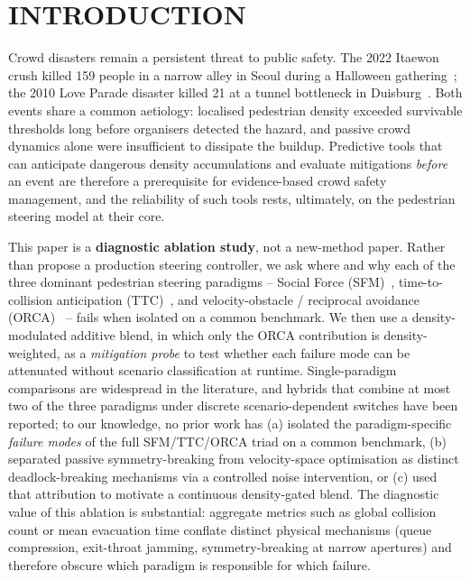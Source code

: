 \documentclass[a4paper,twoside]{article}
\begin{document}
\section{\uppercase{Introduction}}
\label{sec:introduction}

Crowd disasters remain a persistent threat to public safety. The 2022 Itaewon crush killed 159 people in a narrow alley in Seoul during a Halloween gathering~\cite{Lee24}; the 2010 Love Parade disaster killed 21 at a tunnel bottleneck in Duisburg~\cite{Helbing12}. Both events share a common aetiology: localised pedestrian density exceeded survivable thresholds long before organisers detected the hazard, and passive crowd dynamics alone were insufficient to dissipate the buildup. Predictive tools that can anticipate dangerous density accumulations and evaluate mitigations \emph{before} an event are therefore a prerequisite for evidence-based crowd safety management, and the reliability of such tools rests, ultimately, on the pedestrian steering model at their core.

This paper is a \textbf{diagnostic ablation study}, not a new-method paper. Rather than propose a production steering controller, we ask where and why each of the three dominant pedestrian steering paradigms -- Social Force (SFM)~\cite{Helbing95,Helbing00}, time-to-collision anticipation (TTC)~\cite{Karamouzas14}, and velocity-obstacle / reciprocal avoidance (ORCA)~\cite{Fiorini98,VandenBerg11} -- fails when isolated on a common benchmark. We then use a density-modulated additive blend, in which only the ORCA contribution is density-weighted, as a \emph{mitigation probe} to test whether each failure mode can be attenuated without scenario classification at runtime. Single-paradigm comparisons are widespread in the literature, and hybrids that combine at most two of the three paradigms under discrete scenario-dependent switches have been reported; to our knowledge, no prior work has (a) isolated the paradigm-specific \emph{failure modes} of the full SFM/TTC/ORCA triad on a common benchmark, (b) separated passive symmetry-breaking from velocity-space optimisation as distinct deadlock-breaking mechanisms via a controlled noise intervention, or (c) used that attribution to motivate a continuous density-gated blend. The diagnostic value of this ablation is substantial: aggregate metrics such as global collision count or mean evacuation time conflate distinct physical mechanisms (queue compression, exit-throat jamming, symmetry-breaking at narrow apertures) and therefore obscure which paradigm is responsible for which failure.
\end{document}
